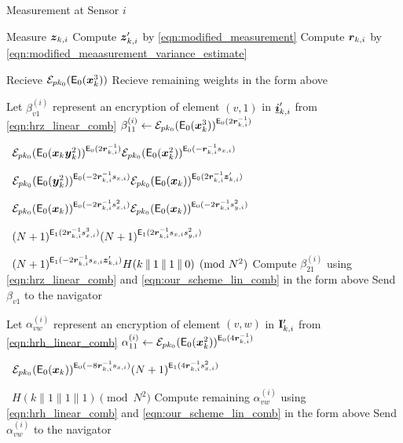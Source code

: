 \documentclass[twocolumn]{autart}
\begin{document}
\begin{algorithm}[htbp]
\caption{Measurement at Sensor $i$}\label{alg:measurement_info}
\begin{algorithmic}[1]

    \State Measure ${\boldsymbol{z}}_{k,i}$
    \State Compute ${\boldsymbol{z}}_{k,i}'$ by \eqref{eqn:modified_measurement}
    \State Compute ${\boldsymbol{r}}_{k, i}$ by \eqref{eqn:modified_meaasurement_variance_estimate}

    \State Recieve $\mathcal{E}_{pk_0}(\mathsf{E}_{0}({\boldsymbol{x}}^3_k))$
    \State Recieve remaining weights in the form above
    \EndWhile

    \State Let $\beta_{v1}^{(i)}$ represent an encryption of element $(v,1)$ in ${\boldsymbol{\underline{i}}}'_{k,i}$ from \eqref{eqn:hrz_linear_comb}
    \State $\beta_{11}^{(i)} \gets \mathcal{E}_{pk_0}(\mathsf{E}_{0}({\boldsymbol{x}}^3_k))^{\mathsf{E}_{0}(2{\boldsymbol{r}}_{k, i}^{-1})}$\par
    \ $\mathcal{E}_{pk_0}(\mathsf{E}_{0}({\boldsymbol{x}}_k{\boldsymbol{y}}^2_k))^{\mathsf{E}_{0}(2{\boldsymbol{r}}_{k, i}^{-1})}
    \mathcal{E}_{pk_0}(\mathsf{E}_{0}({\boldsymbol{x}}^2_k))^{\mathsf{E}_{0}(-{\boldsymbol{r}}_{k, i}^{-1}s_{x,i})}$\par
    \ $\mathcal{E}_{pk_0}(\mathsf{E}_{0}({\boldsymbol{y}}^2_k))^{\mathsf{E}_{0}(-2{\boldsymbol{r}}_{k, i}^{-1}s_{x,i})}
    \mathcal{E}_{pk_0}(\mathsf{E}_{0}({\boldsymbol{x}}_k))^{\mathsf{E}_{0}(2{\boldsymbol{r}}_{k, i}^{-1}{\boldsymbol{z}}_{k,i}')}$\par
    \ $\mathcal{E}_{pk_0}(\mathsf{E}_{0}({\boldsymbol{x}}_k))^{\mathsf{E}_{0}(-2{\boldsymbol{r}}_{k, i}^{-1}s_{x,i}^2)}
    \mathcal{E}_{pk_0}(\mathsf{E}_{0}({\boldsymbol{x}}_k))^{\mathsf{E}_{0}(-2{\boldsymbol{r}}_{k, i}^{-1}s_{y,i}^2)}$\par
    \ $(N+1)^{\mathsf{E}_{1}(2{\boldsymbol{r}}_{k, i}^{-1}s_{x,i}^3)}
    (N+1)^{\mathsf{E}_{1}(2{\boldsymbol{r}}_{k, i}^{-1}s_{x,i}s_{y,i}^2)}$\par
    \ $(N+1)^{\mathsf{E}_{1}(-2{\boldsymbol{r}}_{k, i}^{-1}s_{x,i}{\boldsymbol{z}}_{k,i}')}
    H(k\mathbin\|1\mathbin\|1\mathbin\|0)\pmod{N^2}$
    \State Compute $\beta_{21}^{(i)}$ using \eqref{eqn:hrz_linear_comb} and \eqref{eqn:our_scheme_lin_comb} in the form above
        \State Send $\beta_{v1}$ to the navigator
    \EndFor

    \State Let $\alpha_{vw}^{(i)}$ represent an encryption of element $(v,w)$ in ${{\mathbf{I}}}'_{k,i}$ from \eqref{eqn:hrh_linear_comb}
    \State $\alpha_{11}^{(i)} \gets \mathcal{E}_{pk_0}(\mathsf{E}_{0}({\boldsymbol{x}}^2_k))^{\mathsf{E}_{0}(4{\boldsymbol{r}}_{k, i}^{-1})}$\par
    \ $\mathcal{E}_{pk_0}(\mathsf{E}_{0}({\boldsymbol{x}}_k))^{\mathsf{E}_{0}(-8{\boldsymbol{r}}_{k, i}^{-1}s_{x,i})}
    (N+1)^{\mathsf{E}_{1}(4{\boldsymbol{r}}_{k, i}^{-1}s_{x,i}^2)}$\par
    \ $H(k\mathbin\|1\mathbin\|1\mathbin\|1)\pmod{N^2}$
    \State Compute remaining $\alpha_{vw}^{(i)}$ using \eqref{eqn:hrh_linear_comb} and \eqref{eqn:our_scheme_lin_comb} in the form above
            \State Send $\alpha_{vw}^{(i)}$ to the navigator
        \EndFor
    \EndFor
    \EndProcedure
\end{algorithmic}
\end{algorithm}
\end{document}
